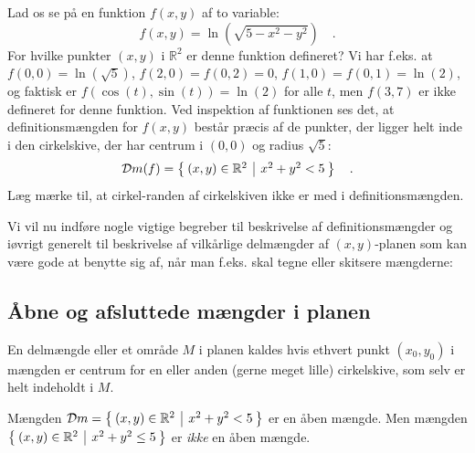 \begin{example}
Lad os se på en funktion $f(x,y)$ af to variable:
\begin{equation}
f(x,y) = \ln(\sqrt{5 - x^{2} - y^{2}}) \quad .
\end{equation}
For hvilke punkter $(x,y)$ i $\mathbb{R}^{2}$ er denne funktion defineret? Vi
har f.eks. at $f(0,0) = \ln(\sqrt{5})$, $f(2,0) = f(0,2) = 0$, $f(1,0) = f(0,1) = \ln(2)$, og faktisk er $f(\cos(t), \sin(t)) = \ln(2)$ for alle $t$, men $f(3, 7)$ er ikke defineret for denne funktion. Ved inspektion af funktionen ses det, at definitionsmængden for $f(x,y)$ består præcis af de punkter, der ligger helt inde i den cirkelskive, der har centrum i $(0,0)$ og radius $\sqrt{5}$:
\begin{equation}
\mathcal{D}m(f) = \left\lbrace \hspace*{-1mm} \begin{array}{c|c} (x,y) \in \mathbb{R}^{2} & x^{2} + y^{2} < 5 \end{array} \hspace*{-1mm} \right\rbrace \quad.
\end{equation}
Læg mærke til, at cirkel-randen af cirkelskiven ikke er med i definitionsmængden.
\end{example}

Vi vil nu  indføre nogle vigtige begreber til beskrivelse af definitionsmængder og iøvrigt generelt til beskrivelse af vilkårlige delmængder af $(x,y)$-planen som kan være gode at benytte sig af, når man f.eks. skal tegne eller skitsere mængderne:

\subsection{Åbne og afsluttede mængder i planen}

\begin{definition} \label{defAAbenMgd}
En delmængde eller et område $M$  i planen kaldes  hvis
ethvert punkt $(x_{0}, y_{0})$ i mængden er centrum for en eller anden (gerne meget lille) cirkelskive, som
selv er helt indeholdt i $M$.
\end{definition}

\begin{example}[En cirkelskive]
Mængden $\mathcal{D}m = \left\lbrace \hspace*{-1mm} \begin{array}{c|c} (x,y) \in \mathbb{R}^{2} & x^{2} + y^{2} < 5 \end{array} \hspace*{-1mm} \right\rbrace$ er en åben mængde. Men mængden
 $\left\lbrace \hspace*{-1mm} \begin{array}{c|c} (x,y) \in \mathbb{R}^{2} & x^{2} + y^{2} \leq 5 \end{array} \hspace*{-1mm} \right\rbrace$ er \emph{ikke} en åben mængde.
\end{example}

